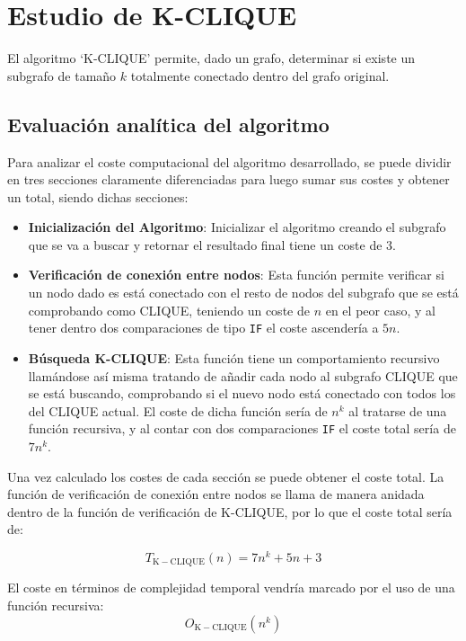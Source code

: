 \section{Estudio de K-CLIQUE}\label{sec:clique}
El algoritmo `K-CLIQUE' permite, dado un grafo, determinar si existe un subgrafo de tamaño $k$ totalmente conectado dentro del grafo original\supercite{bomze1999maximum}.


\subsection*{Evaluación analítica del algoritmo}
Para analizar el coste computacional del algoritmo desarrollado, se puede dividir en tres secciones claramente diferenciadas para luego sumar sus costes y obtener un total, siendo dichas secciones: 

\begin{itemize}
    \item \textbf{Inicialización del Algoritmo}: Inicializar el algoritmo creando el subgrafo que se va a buscar y retornar el resultado final tiene un coste de 3.
    \item \textbf{Verificación de conexión entre nodos}: Esta función permite verificar si un nodo dado es está conectado con el resto de nodos del subgrafo que se está comprobando como CLIQUE, teniendo un coste de $n$ en el peor caso, y al tener dentro dos comparaciones de tipo \texttt{IF} el coste ascendería a $5n$.
    \item \textbf{Búsqueda K-CLIQUE}: Esta función tiene un comportamiento recursivo llamándose así misma tratando de añadir cada nodo al subgrafo CLIQUE que se está buscando, comprobando si el nuevo nodo está conectado con todos los del CLIQUE actual.
    El coste de dicha función sería de $n^k$ al tratarse de una función recursiva, y al contar con dos comparaciones \texttt{IF} el coste total sería de $7n^k$.
\end{itemize}

Una vez calculado los costes de cada sección se puede obtener el coste total. La función de verificación de conexión entre nodos se llama de  manera anidada dentro de la función de verificación de K-CLIQUE, por lo que el coste total sería de:

\begin{equation}
    T_{\mathrm{K-CLIQUE}}(n) = 7n^k + 5n +3
\end{equation}

El coste en términos de complejidad temporal vendría marcado por el uso de una función recursiva: 
\begin{equation}
    O_{\mathrm{K-CLIQUE}}(n^k) 
\end{equation}



